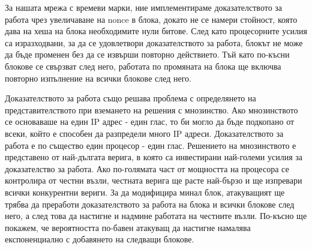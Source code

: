 \documentclass[11pt,a4paper]{article}
\begin{document}
За нашата мрежа с времеви марки, ние имплементираме доказателството за работа чрез увеличаване на nonce в блока, докато не се намери стойност, която дава на хеша на блока необходимите нули битове. След като процесорните усилия са изразходвани, за да се удовлетвори доказателството за работа, блокът не може да бъде променен без да се извърши повторно действието. Тъй като по-късни блокове се свързват след него, работата по промяната на блока ще включва повторно изпълнение на всички блокове след него.

\begin{center}
	\end{center}

Доказателството за работа също решава проблема с определянето на представителството при вземането на решения с мнозинство. Ако мнозинството се основаваше на един IP адрес - един глас, то би могло да бъде подкопано от всеки, който е способен да разпредели много IP адреси. Доказателството за работа е по същество един процесор - един глас. Решението на мнозинството е представено от най-дългата верига, в която са инвестирани най-големи усилия за доказателство за работа. Ако по-голямата част от мощността на процесора се контролира от честни възли, честната верига ще расте най-бързо и ще изпревари всички конкурентни вериги. За да модифицира минал блок, атакуващият ще трябва да преработи доказателството за работа на блока и всички блокове след него, а след това да настигне и надмине работата на честните възли. По-късно ще покажем, че вероятността по-бавен атакуващ да настигне намалява експоненциално с добавянето на следващи блокове.
\end{document}
